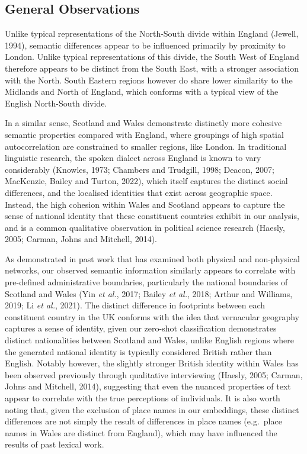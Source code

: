 \documentclass[
]{article}
\begin{document}
\subsection{General Observations}\label{general-observations}

Unlike typical representations of the North-South divide within England
(Jewell, 1994), semantic differences appear to be influenced primarily
by proximity to London. Unlike typical representations of this divide,
the South West of England therefore appears to be distinct from the
South East, with a stronger association with the North. South Eastern
regions however do share lower similarity to the Midlands and North of
England, which conforms with a typical view of the English North-South
divide.

In a similar sense, Scotland and Wales demonstrate distinctly more
cohesive semantic properties compared with England, where groupings of
high spatial autocorrelation are constrained to smaller regions, like
London. In traditional linguistic research, the spoken dialect across
England is known to vary considerably (Knowles, 1973; Chambers and
Trudgill, 1998; Deacon, 2007; MacKenzie, Bailey and Turton, 2022), which
itself captures the distinct social differences, and the localised
identities that exist across geographic space. Instead, the high
cohesion within Wales and Scotland appears to capture the sense of
national identity that these constituent countries exhibit in our
analysis, and is a common qualitative observation in political science
research (Haesly, 2005; Carman, Johns and Mitchell, 2014).

As demonstrated in past work that has examined both physical and
non-physical networks, our observed semantic information similarly
appears to correlate with pre-defined administrative boundaries,
particularly the national boundaries of Scotland and Wales (Yin \emph{et
al.}, 2017; Bailey \emph{et al.}, 2018; Arthur and Williams, 2019; Li
\emph{et al.}, 2021). The distinct difference in footprints between each
constituent country in the UK conforms with the idea that vernacular
geography captures a sense of identity, given our zero-shot
classification demonstrates distinct nationalities between Scotland and
Wales, unlike English regions where the generated national identity is
typically considered British rather than English. Notably however, the
slightly stronger British identity within Wales has been observed
previously through qualitative interviewing (Haesly, 2005; Carman, Johns
and Mitchell, 2014), suggesting that even the nuanced properties of text
appear to correlate with the true perceptions of individuals. It is also
worth noting that, given the exclusion of place names in our embeddings,
these distinct differences are not simply the result of differences in
place names (e.g.~place names in Wales are distinct from England), which
may have influenced the results of past lexical work.
\end{document}
